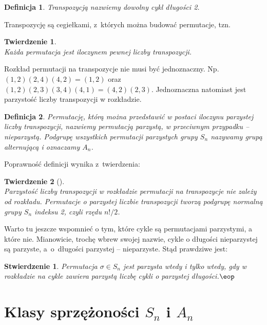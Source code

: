 \documentclass[licencjacka]{pracamgr}
\newtheorem{deff}{Definicja}[section]
\newtheorem{thh}{Twierdzenie}[section]
\newtheorem{fact}{Stwierdzenie}[section]
\begin{document}
\begin{deff}
    \emph{Transpozycją} nazwiemy dowolny cykl długości 2.
\end{deff}

Transpozycję są cegiełkami, z~których można budować permutacje, tzn.

\begin{thh} $ $ \\
    Każda permutacja jest iloczynem pewnej liczby transpozycji.
\end{thh}

Rozkład permutacji na transpozycje nie musi być jednoznaczny. Np.
$(1, 2) (2, 4) (4, 2) = (1, 2)$ oraz $(1, 2) (2, 3) (3, 4) (4, 1) =
(4, 2) (2, 3)$. Jednoznaczna natomiast jest parzystość liczby
transpozycji w rozkładzie.

\begin{deff}
    Permutację, którą można przedstawić w postaci iloczynu parzystej liczby
    transpozycji, nazwiemy \emph{permutacją parzystą},
    w przeciwnym przypadku -- \emph{nieparzystą}.
    Podgrupę wszystkich permutacji parzystych grupy $S_n$ nazywamy \emph{grupą alternującą} i oznaczamy $A_n$.
\end{deff}


Poprawność definicji wynika z~twierdzenia:

\begin{thh}[{\cite[stw. 3.8.]{Baginski}}]\label{thm_A_n} $ $ \\
    Parzystość liczby transpozycji w rozkładzie permutacji na transpozycje nie zależy od rozkładu.
    Permutacje o parzystej liczbie transpozycji tworzą podgrupę normalną grupy $S_n$ indeksu 2, czyli
    rzędu $n!/2$.
\end{thh}

Warto tu jeszcze wspomnieć o tym, które cykle są permutacjami
parzystymi, a które nie. Mianowicie, trochę wbrew swojej nazwie,
cykle o długości nieparzystej są parzyste, a~o~długości parzystej --
nieparzyste. Stąd prawdziwe jest:

\begin{fact}\label{fact_typ_A_n}
    Permutacja $\sigma \in S_n$ jest parzysta wtedy i tylko wtedy, gdy w rozkładzie na cykle
    zawiera parzystą liczbę cykli o parzystej długości.\quad$\eop$
\end{fact}


\section{Klasy sprzężoności $S_n$ i $A_n$}
\end{document}
